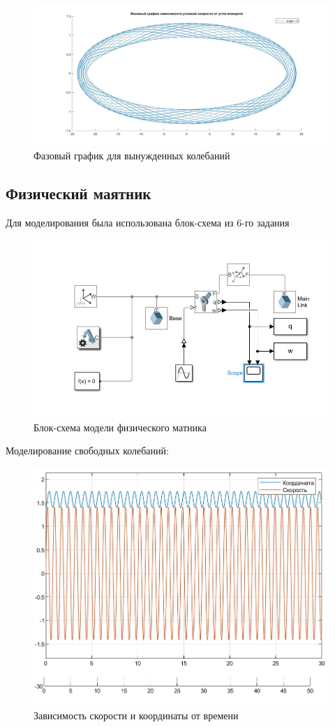 \documentclass{article}
\begin{document}
	\begin{figure}[H]
		\centering
		\includegraphics[width=0.7\linewidth]{phase3}
		\caption{Фазовый график для вынужденных колебаний}
		\label{fig:phase3}
	\end{figure}
	\subsection*{Физический маятник}
	Для моделирования была использована блок-схема из 6-го задания
	\begin{figure}[H]
		\centering
		\includegraphics[width=0.7\linewidth]{model}
		\caption{Блок-схема модели физического матника}
		\label{fig:model}
	\end{figure}
	Моделирование свободных колебаний:
	\begin{figure}[H]
		\centering
		\includegraphics[width=0.7\linewidth]{phys1}
		\caption{Зависимость скорости и координаты от времени}
		\label{fig:phys1}
	\end{figure}
\end{document}

